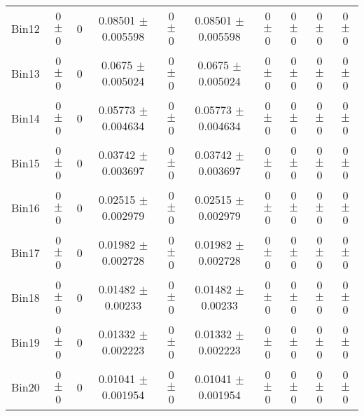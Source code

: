 \begin{tabular}{@{\extracolsep{4pt}}lccccccccc@{}}
     Bin12 & 0 $\pm$ 0 & 0 & 0.08501 $\pm$ 0.005598 & 0 $\pm$ 0 & 0.08501 $\pm$ 0.005598 & 0 $\pm$ 0 & 0 $\pm$ 0 & 0 $\pm$ 0 & 0 $\pm$ 0 \\ 
     Bin13 & 0 $\pm$ 0 & 0 & 0.0675 $\pm$ 0.005024 & 0 $\pm$ 0 & 0.0675 $\pm$ 0.005024 & 0 $\pm$ 0 & 0 $\pm$ 0 & 0 $\pm$ 0 & 0 $\pm$ 0 \\ 
     Bin14 & 0 $\pm$ 0 & 0 & 0.05773 $\pm$ 0.004634 & 0 $\pm$ 0 & 0.05773 $\pm$ 0.004634 & 0 $\pm$ 0 & 0 $\pm$ 0 & 0 $\pm$ 0 & 0 $\pm$ 0 \\ 
     Bin15 & 0 $\pm$ 0 & 0 & 0.03742 $\pm$ 0.003697 & 0 $\pm$ 0 & 0.03742 $\pm$ 0.003697 & 0 $\pm$ 0 & 0 $\pm$ 0 & 0 $\pm$ 0 & 0 $\pm$ 0 \\ 
     Bin16 & 0 $\pm$ 0 & 0 & 0.02515 $\pm$ 0.002979 & 0 $\pm$ 0 & 0.02515 $\pm$ 0.002979 & 0 $\pm$ 0 & 0 $\pm$ 0 & 0 $\pm$ 0 & 0 $\pm$ 0 \\ 
     Bin17 & 0 $\pm$ 0 & 0 & 0.01982 $\pm$ 0.002728 & 0 $\pm$ 0 & 0.01982 $\pm$ 0.002728 & 0 $\pm$ 0 & 0 $\pm$ 0 & 0 $\pm$ 0 & 0 $\pm$ 0 \\ 
     Bin18 & 0 $\pm$ 0 & 0 & 0.01482 $\pm$ 0.00233 & 0 $\pm$ 0 & 0.01482 $\pm$ 0.00233 & 0 $\pm$ 0 & 0 $\pm$ 0 & 0 $\pm$ 0 & 0 $\pm$ 0 \\ 
     Bin19 & 0 $\pm$ 0 & 0 & 0.01332 $\pm$ 0.002223 & 0 $\pm$ 0 & 0.01332 $\pm$ 0.002223 & 0 $\pm$ 0 & 0 $\pm$ 0 & 0 $\pm$ 0 & 0 $\pm$ 0 \\ 
     Bin20 & 0 $\pm$ 0 & 0 & 0.01041 $\pm$ 0.001954 & 0 $\pm$ 0 & 0.01041 $\pm$ 0.001954 & 0 $\pm$ 0 & 0 $\pm$ 0 & 0 $\pm$ 0 & 0 $\pm$ 0 \\ 
\hline\hline
  \end{tabular}
